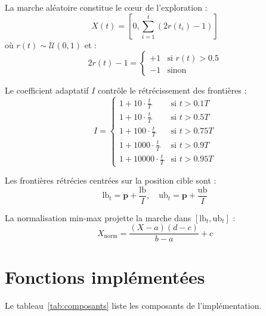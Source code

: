 \documentclass[12pt,a4paper,twoside]{report}
\begin{document}
La marche aléatoire constitue le c{\oe}ur de l'exploration :
\begin{equation}
X(t) = \left[0, \sum_{i=1}^{t} (2r(t_i)-1)\right]
\end{equation}
où $r(t) \sim \mathcal{U}(0,1)$ et :
\begin{equation}
2r(t)-1 = \begin{cases} +1 & \text{si } r(t) > 0.5 \\ -1 & \text{sinon} \end{cases}
\end{equation}

Le coefficient adaptatif $I$ contrôle le rétrécissement des frontières :
\begin{equation}
I = 
\begin{cases}
1 + 10 \cdot \frac{t}{T} & \text{si } t > 0.1T \\
1 + 10 \cdot \frac{t}{T} & \text{si } t > 0.5T \\
1 + 100 \cdot \frac{t}{T} & \text{si } t > 0.75T \\
1 + 1000 \cdot \frac{t}{T} & \text{si } t > 0.9T \\
1 + 10000 \cdot \frac{t}{T} & \text{si } t > 0.95T
\end{cases}
\end{equation}

Les frontières rétrécies centrées sur la position cible sont :
\begin{equation}
\text{lb}_t = \mathbf{p} + \frac{\text{lb}}{I}, \quad \text{ub}_t = \mathbf{p} + \frac{\text{ub}}{I}
\end{equation}

La normalisation min-max projette la marche dans $[\text{lb}_t, \text{ub}_t]$ :
\begin{equation}
X_{\text{norm}} = \frac{(X - a)(d - c)}{b - a} + c
\end{equation}

\section{Fonctions implémentées}

Le tableau~\ref{tab:composants} liste les composants de l'implémentation.
\end{document}
